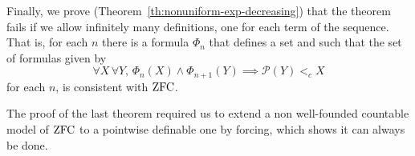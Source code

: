 Finally, we prove (Theorem~\ref{th:nonuniform-exp-decreasing}) that the theorem fails if we allow infinitely many
definitions, one for each term of the sequence. That is, for
each $n$ there is a formula $\Phi_n$ that defines a set and such that the set of
formulas given by
\[
  \forall X\, \forall Y,\,  \Phi_n(X) \land \Phi_{n+1}(Y) \implies
  \mathcal{P}(Y) <_c X
\]
for each $n$, is consistent with $\mathrm{ZFC}$.

The proof of the last theorem required us to extend a non well-founded countable
model of $\mathrm{ZFC}$ to a pointwise definable one by forcing, which \cite{hamkins}
shows it can always be done.

